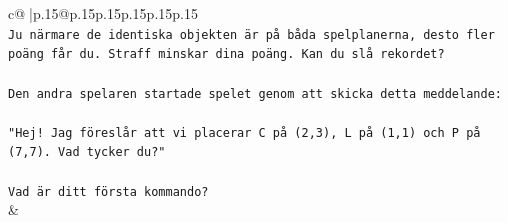 \documentclass{article}
\begin{document}
{\begin{supertabular}{c@{$\;$}|p{.15\linewidth}@{}p{.15\linewidth}p{.15\linewidth}p{.15\linewidth}p{.15\linewidth}p{.15\linewidth}}
{{{\\ 
\texttt{Ju närmare de identiska objekten är på båda spelplanerna, desto fler poäng får du. Straff minskar dina poäng. Kan du slå rekordet?} \\
\\ 
\texttt{Den andra spelaren startade spelet genom att skicka detta meddelande:} \\
\\ 
\texttt{"Hej! Jag föreslår att vi placerar C på (2,3), L på (1,1) och P på (7,7). Vad tycker du?"} \\
\\ 
\texttt{Vad är ditt första kommando?} \\
            }
        }
    }
    & \\ \\


\end{supertabular}}
\end{document}
